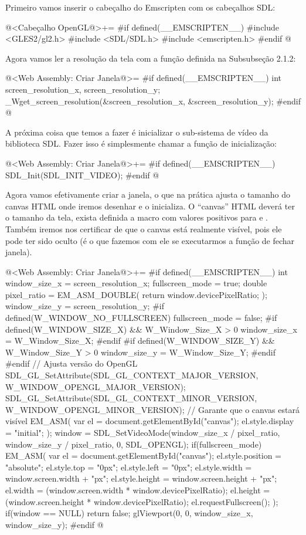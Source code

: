 Primeiro vamos inserir o cabeçalho do Emscripten com os cabeçalhos SDL:

\iniciocodigo
@<Cabeçalho OpenGL@>+=
#if defined(__EMSCRIPTEN__)
#include <GLES2/gl2.h>
#include <SDL/SDL.h>
#include <emscripten.h>
#endif
@
\fimcodigo

Agora vamos ler a resolução da tela com a função definida na Subsubseção 2.1.2:

\iniciocodigo
@<Web Assembly: Criar Janela@>=
#if defined(__EMSCRIPTEN__)
int screen_resolution_x, screen_resolution_y;
_Wget_screen_resolution(&screen_resolution_x, &screen_resolution_y);
#endif
@
\fimcodigo

A próxima coisa que temos a fazer é inicializar o sub-sistema de vídeo
da biblioteca SDL. Fazer isso é simplesmente chamar a função de
inicialização:

\iniciocodigo
@<Web Assembly: Criar Janela@>+=
#if defined(__EMSCRIPTEN__)
SDL_Init(SDL_INIT_VIDEO);
#endif
@
\fimcodigo

Agora vamos efetivamente criar a janela, o que na prática ajusta o
tamanho do canvas HTML onde iremos desenhar e o inicializa. O
``canvas'' HTML deverá ter o tamanho da tela, exista definida a
macro  com valores positivos
para 
e . Também iremos nos certificar
de que o canvas está realmente visível, pois ele pode ter sido oculto
(é o que fazemos com ele se executarmos a função de fechar janela).

\iniciocodigo
@<Web Assembly: Criar Janela@>+=
#if defined(__EMSCRIPTEN__)
{
  int window_size_x = screen_resolution_x;
  fullscreen_mode = true;
  double pixel_ratio = EM_ASM_DOUBLE({
    return window.devicePixelRatio;
  });
  window_size_y = screen_resolution_y;
#if defined(W_WINDOW_NO_FULLSCREEN)
  fullscreen_mode = false;
#if defined(W_WINDOW_SIZE_X) && W_Window_Size_X > 0
  window_size_x = W_Window_Size_X;
#endif
#if defined(W_WINDOW_SIZE_Y) && W_Window_Size_Y > 0
  window_size_y = W_Window_Size_Y;
#endif
#endif
  // Ajusta versão do OpenGL
  SDL_GL_SetAttribute(SDL_GL_CONTEXT_MAJOR_VERSION,
                     W_WINDOW_OPENGL_MAJOR_VERSION);
  SDL_GL_SetAttribute(SDL_GL_CONTEXT_MINOR_VERSION,
                     W_WINDOW_OPENGL_MINOR_VERSION);
  // Garante que o canvas estará visível
  EM_ASM(
    var el = document.getElementById("canvas");
    el.style.display = "initial";
  );
  window = SDL_SetVideoMode(window_size_x / pixel_ratio,
                            window_size_y / pixel_ratio, 0, SDL_OPENGL);
  if(fullscreen_mode){
    EM_ASM(
      var el = document.getElementById("canvas");
      el.style.position = "absolute";
      el.style.top = "0px";
      el.style.left = "0px";
      el.style.width = window.screen.width + "px";
      el.style.height = window.screen.height + "px";
      el.width = (window.screen.width * window.devicePixelRatio);
      el.height = (window.screen.height * window.devicePixelRatio);
      el.requestFullscreen();
    );
  }
  if(window == NULL)
    return false;
  glViewport(0, 0, window_size_x, window_size_y);
}
#endif
@
\fimcodigo

